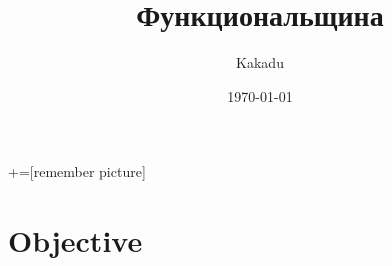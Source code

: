 \documentclass{beamer}
\title[Part of thesis title]{Функциональщина}
\author{Kakadu}
\institute{St Petersburg University}
\date{\today}
\def\faQuestionSign{{\FA\symbol{"F059}}}
\begin{document}

+=[remember picture]

\everymath{\displaystyle}


\section{Objective}

% 
% 
% 
% 
\end{document}

